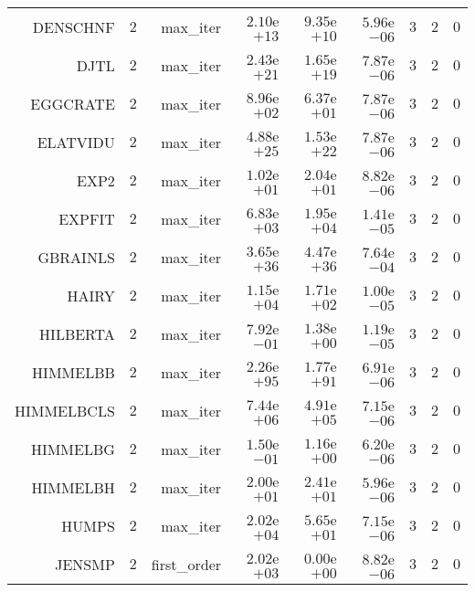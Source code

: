 \begin{longtable}{rrrrrrrrr}
DENSCHNF & \(     2\) & max\_iter & \( 2.10\)e\(+13\) & \( 9.35\)e\(+10\) & \( 5.96\)e\(-06\) & \(     3\) & \(     2\) & \(     0\) \\
DJTL & \(     2\) & max\_iter & \( 2.43\)e\(+21\) & \( 1.65\)e\(+19\) & \( 7.87\)e\(-06\) & \(     3\) & \(     2\) & \(     0\) \\
EGGCRATE & \(     2\) & max\_iter & \( 8.96\)e\(+02\) & \( 6.37\)e\(+01\) & \( 7.87\)e\(-06\) & \(     3\) & \(     2\) & \(     0\) \\
ELATVIDU & \(     2\) & max\_iter & \( 4.88\)e\(+25\) & \( 1.53\)e\(+22\) & \( 7.87\)e\(-06\) & \(     3\) & \(     2\) & \(     0\) \\
EXP2 & \(     2\) & max\_iter & \( 1.02\)e\(+01\) & \( 2.04\)e\(+01\) & \( 8.82\)e\(-06\) & \(     3\) & \(     2\) & \(     0\) \\
EXPFIT & \(     2\) & max\_iter & \( 6.83\)e\(+03\) & \( 1.95\)e\(+04\) & \( 1.41\)e\(-05\) & \(     3\) & \(     2\) & \(     0\) \\
GBRAINLS & \(     2\) & max\_iter & \( 3.65\)e\(+36\) & \( 4.47\)e\(+36\) & \( 7.64\)e\(-04\) & \(     3\) & \(     2\) & \(     0\) \\
HAIRY & \(     2\) & max\_iter & \( 1.15\)e\(+04\) & \( 1.71\)e\(+02\) & \( 1.00\)e\(-05\) & \(     3\) & \(     2\) & \(     0\) \\
HILBERTA & \(     2\) & max\_iter & \( 7.92\)e\(-01\) & \( 1.38\)e\(+00\) & \( 1.19\)e\(-05\) & \(     3\) & \(     2\) & \(     0\) \\
HIMMELBB & \(     2\) & max\_iter & \( 2.26\)e\(+95\) & \( 1.77\)e\(+91\) & \( 6.91\)e\(-06\) & \(     3\) & \(     2\) & \(     0\) \\
HIMMELBCLS & \(     2\) & max\_iter & \( 7.44\)e\(+06\) & \( 4.91\)e\(+05\) & \( 7.15\)e\(-06\) & \(     3\) & \(     2\) & \(     0\) \\
HIMMELBG & \(     2\) & max\_iter & \( 1.50\)e\(-01\) & \( 1.16\)e\(+00\) & \( 6.20\)e\(-06\) & \(     3\) & \(     2\) & \(     0\) \\
HIMMELBH & \(     2\) & max\_iter & \( 2.00\)e\(+01\) & \( 2.41\)e\(+01\) & \( 5.96\)e\(-06\) & \(     3\) & \(     2\) & \(     0\) \\
HUMPS & \(     2\) & max\_iter & \( 2.02\)e\(+04\) & \( 5.65\)e\(+01\) & \( 7.15\)e\(-06\) & \(     3\) & \(     2\) & \(     0\) \\
JENSMP & \(     2\) & first\_order & \( 2.02\)e\(+03\) & \( 0.00\)e\(+00\) & \( 8.82\)e\(-06\) & \(     3\) & \(     2\) & \(     0\) \\

\end{longtable}
